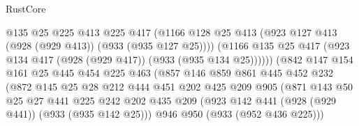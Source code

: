 \begin{lexlean}{RustCore}
\begin{coremodule}
                                    @135
                                    @25
                                    @225
                                    @413
                                    @225
                                    @417
                                    (@1166
                                      @128
                                      @25
                                      @413
                                      (@923 @127 @413 (@928 (@929 @413)) (@933 (@935 @127 @25))))
                                    (@1166
                                      @135
                                      @25
                                      @417
                                      (@923 @134 @417 (@928 (@929 @417)) (@933 (@935 @134 @25))))))
                                (@842
                                  @147
                                  @154
                                  @161
                                  @25
                                  @445
                                  @454
                                  @225
                                  @463
                                  (@857
                                    @146
                                    @859
                                    @861
                                    @445
                                    @452
                                    @232
                                    (@872
                                      @145
                                      @25
                                      @28
                                      @212
                                      @444
                                      @451
                                      @202
                                      @425
                                      @209
                                      @905
                                      (@871
                                        @143
                                        @50
                                        @25
                                        @27
                                        @441
                                        @225
                                        @242
                                        @202
                                        @435
                                        @209
                                        (@923 @142 @441 (@928 (@929 @441)) (@933 (@935 @142 @25)))
                                        @946
                                        @950
                                        (@933 (@952 @436 @225)))

\end{coremodule}
\end{lexlean}
